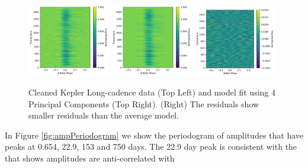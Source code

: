 \documentclass[preprint]{aastex61}
\begin{document}
\begin{figure}[!hbtp]
\begin{centering}
\includegraphics[width=0.32\textwidth]{images/kepler/photometry_riverplot.pdf}
\includegraphics[width=0.32\textwidth]{images/kepler/pca_model_2D.pdf}
\includegraphics[width=0.32\textwidth]{images/kepler/pca_resid_2D.pdf}
\caption{Cleaned Kepler Long-cadence data (Top Left) and model fit using 4 Principal Components (Top Right).
(Right) The residuals show smaller residuals than the average model.
}\label{fig:riverPlotsPCA}
\end{centering}
\end{figure}

In Figure \ref{fig:ampPeriodogram} we show the periodogram of amplitudes that have peaks at 0.654, 22.9, 153 and 750 days.
The 22.9 day peak is consistent with the \citet{kawahara2013starspots} that shows amplitudes are anti-correlated with 
\end{document}
